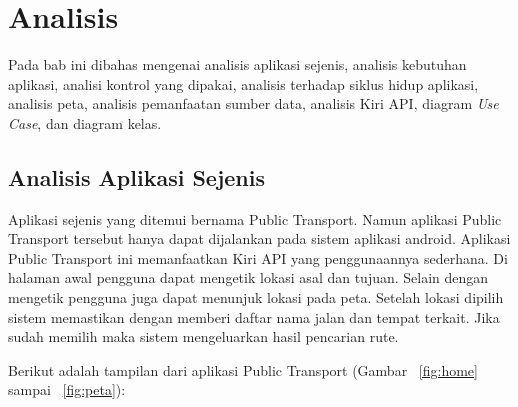 \chapter{Analisis}
\label{chap:analisi}

Pada bab ini dibahas mengenai analisis aplikasi sejenis, analisis kebutuhan aplikasi, analisi kontrol yang dipakai, analisis terhadap siklus hidup aplikasi, analisis peta, analisis pemanfaatan sumber data, analisis Kiri API, diagram \textit{Use Case}, dan diagram kelas.

\section{Analisis Aplikasi Sejenis}
\label{lab:Analisis Aplikasi Sejenis}
\hspace{0.5cm} Aplikasi sejenis yang ditemui bernama Public Transport\footnotemark[1]. Namun aplikasi Public Transport tersebut hanya dapat dijalankan pada sistem aplikasi android. Aplikasi Public Transport ini memanfaatkan Kiri API yang penggunaannya sederhana. Di halaman awal pengguna dapat mengetik lokasi asal dan tujuan. Selain dengan mengetik pengguna juga dapat menunjuk lokasi pada peta. Setelah lokasi dipilih sistem memastikan dengan memberi daftar nama jalan dan tempat terkait. Jika sudah memilih maka sistem mengeluarkan hasil pencarian rute.

Berikut adalah tampilan dari aplikasi Public Transport (Gambar ~\ref{fig:home} sampai ~\ref{fig:peta}):

